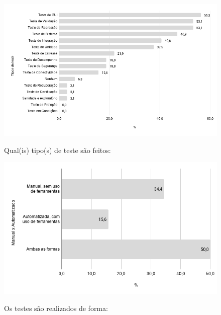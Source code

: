   
        \begin{figure}[!htb]
        \centering
        \includegraphics[width=.90\textwidth]{images/s_tipostestes.png}
        \label{figure:s_tipostestes}
        \caption{Qual(is) tipo(s) de teste são feitos:}
        \end{figure}
    
    
        \begin{figure}[!htb]
        \centering
        \includegraphics[width=.80\textwidth]{images/s_formatestes.png}
        \label{figure:s_formatestes}
        \caption{Os testes são realizados de forma:}
        \end{figure}    
    
